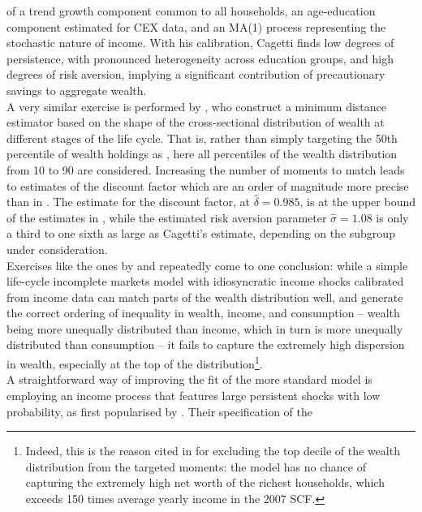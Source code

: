 of a trend growth component common to all households, an age-education component
estimated for CEX data, and an MA(1) process representing the stochastic nature
of income. With his calibration, Cagetti finds low degrees of persistence, with
pronounced heterogeneity across education groups, and high degrees of risk 
aversion, implying a significant contribution of precautionary savings to 
aggregate wealth. \\
A very similar exercise is performed by \citet{HintermaierKoeniger2011}, who 
construct a minimum distance estimator based on the shape of the cross-sectional
distribution of wealth at different stages of the life cycle. That is, rather
than simply targeting the 50th percentile of wealth holdings  as 
\citet{Cagetti2003}, here all percentiles of the wealth distribution from 10 
to 90 are considered. Increasing the number of moments to match leads to estimates 
of the discount factor which are an order of magnitude more precise than in 
\citet{Cagetti2003}. The estimate for the discount factor, at $\hat{\delta}=0.985$, 
is at the upper bound of the estimates in \citet{Cagetti2003}, while the 
estimated risk aversion parameter $\hat{\sigma}=1.08$ is only a third to one 
sixth as large as Cagetti's estimate, depending on the subgroup under consideration. \\
Exercises like the ones by \citet{Cagetti2003} and \citet{HintermaierKoeniger2011}
repeatedly come to one conclusion: while a simple life-cycle incomplete markets
model with idiosyncratic income shocks calibrated from income data can match 
parts of the wealth distribution well, and generate the correct ordering of 
inequality in wealth, income, and consumption -- wealth being more unequally 
distributed than income, which in turn is more unequally distributed than 
consumption -- it fails to capture the extremely high dispersion in wealth, 
especially at the top of the distribution\footnote{Indeed, this is the reason
cited in \citet{HintermaierKoeniger2011} for excluding the top decile of the 
wealth distribution from the targeted moments: the model has no chance of capturing
the extremely high net worth of the richest households, which exceeds 150 times
average yearly income in the 2007 SCF.}. 
\vspace{0.5cm}\\
A straightforward way of improving the fit of the more standard model is employing an
income process that features large persistent shocks with low probability, as 
first popularised by \citet{CastanedaRiosRull2003}. Their specification of the 
